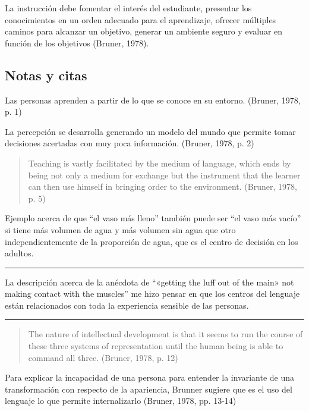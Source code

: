 \documentclass[
  12,
]{scrartcl}
\begin{document}
La instrucción debe fomentar el interés del estudiante, presentar los
conocimientos en un orden adecuado para el aprendizaje, ofrecer
múltiples caminos para alcanzar un objetivo, generar un ambiente seguro
y evaluar en función de los objetivos (Bruner, 1978).

\hypertarget{notas-y-citas}{%
\subsection{Notas y citas}\label{notas-y-citas}}

Las personas aprenden a partir de lo que se conoce en su entorno.
(Bruner, 1978, p. 1)

La percepción se desarrolla generando un modelo del mundo que permite
tomar decisiones acertadas con muy poca información. (Bruner, 1978, p.
2)

\begin{quote}
Teaching is vastly facilitated by the medium of language, which ends by
being not only a medium for exchange but the instrument that the learner
can then use himself in bringing order to the environment. (Bruner,
1978, p. 5)
\end{quote}

Ejemplo acerca de que ``el vaso más lleno'' también puede ser ``el vaso
más vacío'' si tiene más volumen de agua y más volumen sin agua que otro
independientemente de la proporción de agua, que es el centro de
decisión en los adultos.

\begin{center}\rule{0.5\linewidth}{0.5pt}\end{center}

La descripción acerca de la anécdota de ``«getting the luff out of the
main» not making contact with the muscles'' me hizo pensar en que los
centros del lenguaje están relacionados con toda la experiencia sensible
de las personas.

\begin{center}\rule{0.5\linewidth}{0.5pt}\end{center}

\begin{quote}
The nature of intellectual development is that it seems to run the
course of these three systems of representation until the human being is
able to command all three. (Bruner, 1978, p. 12)
\end{quote}

Para explicar la incapacidad de una persona para entender la invariante
de una transformación con respecto de la apariencia, Brunner sugiere que
es el uso del lenguaje lo que permite internalizarlo (Bruner, 1978, pp.
13-14)
\end{document}
